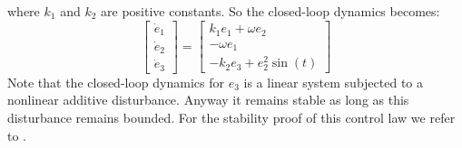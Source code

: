 where $k_1$ and $k_2$ are positive constants. So the closed-loop dynamics becomes:
\begin{equation}
	\left[\begin{matrix}
	\dot{e}_1\\\dot{e}_2\\\dot{e}_3
	\end{matrix}\right] = 
	\left[\begin{matrix}
	k_1e_1+\omega e_2\\-\omega e_1\\-k_2e_3+e_2^2\sin(t)
	\end{matrix}\right]
\end{equation}
Note that the closed-loop dynamics for $e_3$ is a linear system subjected to a nonlinear additive disturbance. Anyway it remains stable as long as this disturbance remains bounded. For the stability proof of this control law we refer to \cite{dixon}.
